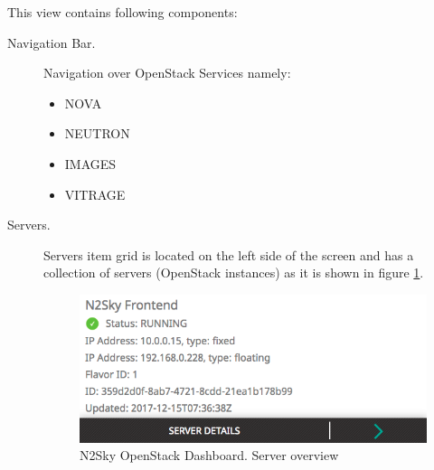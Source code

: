 This view contains following components:
\begin{description}
\item[Navigation Bar.] Navigation over OpenStack Services namely:
\begin{itemize}
\item NOVA
\item NEUTRON
\item IMAGES
\item VITRAGE
\end{itemize}
 
 \item[Servers.] Servers item grid is located on the left side of the screen and has a collection of servers (OpenStack instances) as it is shown in figure \ref{fig:openstack_servers}. 
 
 \begin{figure}[H]
\begin{center}
  \includegraphics[scale=0.5]{components/4/pics/openstack_servers.png}
  \caption{N2Sky OpenStack Dashboard. Server overview}
  \label{fig:openstack_servers}
\end{center}
\end{figure}


\end{description}
